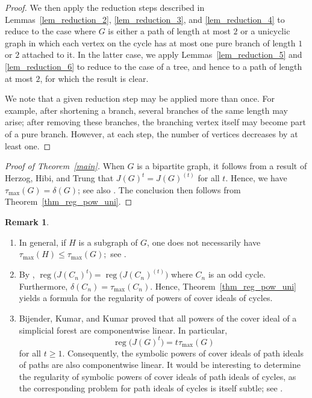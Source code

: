 \documentclass[12pt,amscd]{amsart}
\theoremstyle{definition}
\newtheorem{rem}[thm]{Remark}
\DeclareMathOperator{\reg}{reg}
\begin{document}
\begin{proof}
We then apply the reduction steps described in Lemmas~\ref{lem_reduction_2}, \ref{lem_reduction_3}, and \ref{lem_reduction_4} to reduce to the case where $G$ is either a path of length at most $2$ or a unicyclic graph in which each vertex on the cycle has at most one pure branch of length $1$ or $2$ attached to it. In the latter case, we apply Lemmas~\ref{lem_reduction_5} and \ref{lem_reduction_6} to reduce to the case of a tree, and hence to a path of length at most $2$, for which the result is clear.

We note that a given reduction step may be applied more than once. For example, after shortening a branch, several branches of the same length may arise; after removing these branches, the branching vertex itself may become part of a pure branch. However, at each step, the number of vertices decreases by at least one.
\end{proof}


\begin{proof}[Proof of Theorem~\ref{main}] When $G$ is a bipartite graph, it follows from a result of Herzog, Hibi, and Trung \cite{HHT} that $J(G)^t = J(G)^{(t)}$ for all $t$. Hence, we have $\tau_{\max}(G) = \delta(G)$; see also \cite[Theorem~4.9]{DHNT}. The conclusion then follows from Theorem~\ref{thm_reg_pow_uni}.
\end{proof}

\begin{rem}
\begin{enumerate}
    \item In general, if $H$ is a subgraph of $G$, one does not necessarily have
    \(     \tau_{\max}(H) \le \tau_{\max}(G);    \) see \cite{F3}.
    \item By \cite[Theorem 2.4]{LW},     \(    \reg\bigl(J(C_n)^t\bigr)
    =
    \reg\bigl(J(C_n)^{(t)}\bigr)
    \) where $C_n$ is an odd cycle. Furthermore,
    \(    \delta(C_n) = \tau_{\max}(C_n).    \) Hence, Theorem~\ref{thm_reg_pow_uni} yields a formula for the regularity of powers of cover ideals of cycles.
    \item Bijender, Kumar, and Kumar \cite{BKK} proved that all powers of the cover ideal of a simplicial forest are componentwise linear. In particular,
    \[
    \reg\bigl(J(G)^t\bigr) = t \tau_{\max}(G)
    \]
    for all $t \ge 1$. Consequently, the symbolic powers of cover ideals of path ideals of paths are also componentwise linear. It would be interesting to determine the regularity of symbolic powers of cover ideals of path ideals of cycles, as the corresponding problem for path ideals of cycles is itself subtle; see \cite{BCV}.
\end{enumerate}
\end{rem}
\end{document}
